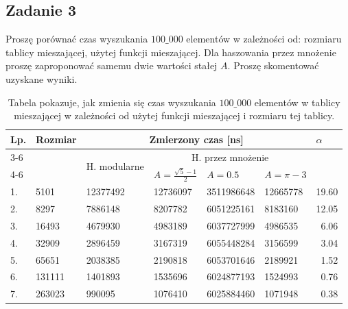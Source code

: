 \documentclass[twoside]{article}
\begin{document}
\subsection{Zadanie 3}
Proszę porównać czas wyszukania $100\_000$ elementów w zależności od: rozmiaru tablicy mieszającej,
użytej funkcji mieszającej. Dla haszowania przez mnożenie proszę zaproponować samemu dwie 
wartości stałej $A$. Proszę skomentować uzyskane wyniki.

\begin{table}[h]
\begin{tabular}{|l|l|llll|r|}
\hline
\multirow{3}{*}{Lp.} &
  \multirow{3}{*}{Rozmiar} &
  \multicolumn{4}{c|}{Zmierzony czas [ns]} &
  \multicolumn{1}{l|}{\multirow{3}{*}{$\alpha$}} \\ \cline{3-6}
 &
   &
  \multicolumn{1}{l|}{\multirow{2}{*}{H. modularne}} &
  \multicolumn{3}{c|}{H. przez mnożenie} &
  \multicolumn{1}{l|}{} \\ \cline{4-6}
 &
   &
  \multicolumn{1}{l|}{} &
  \multicolumn{1}{l|}{$A=\frac{\sqrt{5}-1}{2}$} &
  \multicolumn{1}{l|}{$A=0.5$} &
  \multicolumn{1}{l|}{$A=\pi-3$} &
  \multicolumn{1}{l|}{} \\ \hline
1. & 5101   & \multicolumn{1}{l|}{12377492} & \multicolumn{1}{l|}{12736097} & \multicolumn{1}{l|}{3511986648} & \multicolumn{1}{l|}{12665778} & 19.60 \\ \hline
2. & 8297   & \multicolumn{1}{l|}{7886148}  & \multicolumn{1}{l|}{8207782}  & \multicolumn{1}{l|}{6051225161} & \multicolumn{1}{l|}{8183160} & 12.05 \\ \hline
3. & 16493  & \multicolumn{1}{l|}{4679930}  & \multicolumn{1}{l|}{4983189}  & \multicolumn{1}{l|}{6037727999} & \multicolumn{1}{l|}{4986535} & 6.06  \\ \hline
4. & 32909  & \multicolumn{1}{l|}{2896459}  & \multicolumn{1}{l|}{3167319}  & \multicolumn{1}{l|}{6055448284} & \multicolumn{1}{l|}{3156599} & 3.04  \\ \hline
5. & 65651  & \multicolumn{1}{l|}{2038385}  & \multicolumn{1}{l|}{2190818}  & \multicolumn{1}{l|}{6053701646} & \multicolumn{1}{l|}{2189921} & 1.52  \\ \hline
6. & 131111 & \multicolumn{1}{l|}{1401893}  & \multicolumn{1}{l|}{1535696}  & \multicolumn{1}{l|}{6024877193} & \multicolumn{1}{l|}{1524993} & 0.76  \\ \hline
7. & 263023 & \multicolumn{1}{l|}{990095}   & \multicolumn{1}{l|}{1076410}  & \multicolumn{1}{l|}{6025884460} & \multicolumn{1}{l|}{1071948} & 0.38  \\ \hline
\end{tabular}
\caption{Tabela pokazuje, jak zmienia się czas wyszukania $100\_000$ elementów w tablicy 
mieszającej w zależności od użytej funkcji mieszającej i rozmiaru tej tablicy.}
\end{table}
\end{document}

